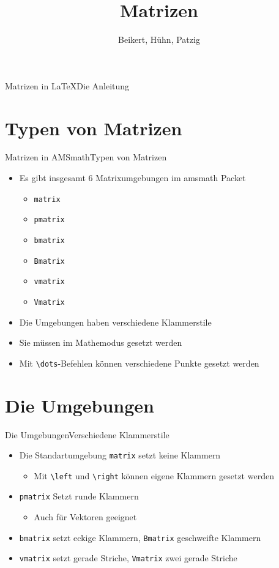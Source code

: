 \documentclass{beamer}
\title{Matrizen}
\author{Beikert, Hühn, Patzig}
\begin{document}
\frame{\titlepage}
\begin{frame}{Matrizen in \LaTeX}{Die Anleitung}
\tableofcontents
\end{frame}
\section{Typen von Matrizen}
\begin{frame}[fragile]{Matrizen in AMSmath}{Typen von Matrizen}
\begin{itemize}
\item Es gibt insgesamt 6 Matrixumgebungen im amsmath Packet
	\begin{itemize}
	\item<+-> \texttt{matrix}
	\item<+->  \texttt{pmatrix}
	\item<+->  \texttt{bmatrix}
	\item<+->  \texttt{Bmatrix}
	\item<+->  \texttt{vmatrix}
	\item<+->  \texttt{Vmatrix}
	\end{itemize}
\item Die Umgebungen haben verschiedene Klammerstile
\item Sie müssen im Mathemodus gesetzt werden
\item<+->  Mit \verb|\dots|-Befehlen können verschiedene Punkte gesetzt werden
\end{itemize}
\end{frame}
\section{Die Umgebungen}
\begin{frame}[fragile]{Die Umgebungen}{Verschiedene Klammerstile}
\begin{itemize}
\item<+-> Die Standartumgebung \texttt{matrix} setzt keine Klammern
	\begin{itemize}
	\item<+->  Mit \verb|\left| und \verb|\right| können eigene Klammern gesetzt werden
	\end{itemize}
\item<+->  \texttt{pmatrix} Setzt runde Klammern
	\begin{itemize}
	\item<+->  Auch für Vektoren geeignet
	\end{itemize}
\item<+->  \texttt{bmatrix} setzt eckige Klammern, \texttt{Bmatrix} geschweifte Klammern
\item<+->  \texttt{vmatrix} setzt gerade Striche, \texttt{Vmatrix} zwei gerade Striche
\end{itemize}
\end{frame}
\end{document}
